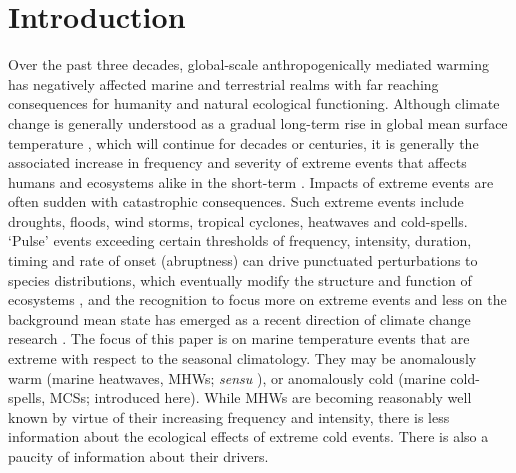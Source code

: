\documentclass[a4paper,10pt,review]{elsarticle}
\begin{document}
\linenumbers

\section{Introduction}

Over the past three decades, global-scale anthropogenically mediated warming has negatively affected marine and terrestrial realms with far reaching consequences for humanity and natural ecological functioning. Although climate change is generally understood as a gradual long-term rise in global mean surface temperature \citep{IPCC2014}, which will continue for decades or centuries, it is generally the associated increase in frequency and severity of extreme events that affects humans and ecosystems alike in the short-term \citep{Easterling2000}. Impacts of extreme events are often sudden with catastrophic consequences. Such extreme events include droughts, floods, wind storms, tropical cyclones, heatwaves and cold-spells. `Pulse' events exceeding certain thresholds of frequency, intensity, duration, timing and rate of onset (abruptness) can drive punctuated perturbations to species distributions, which eventually modify the structure and function of ecosystems \citep{Wernberg2013, Rehage2016}, and the recognition to focus more on extreme events and less on the background mean state has emerged as a recent direction of climate change research \citep{Jentsch2007}. The focus of this paper is on marine temperature events that are extreme with respect to the seasonal climatology. They may be anomalously warm (marine heatwaves, MHWs; \emph{sensu} \citet{Hobday2016}), or anomalously cold (marine cold-spells, MCSs; introduced here). While MHWs are becoming reasonably well known by virtue of their increasing frequency and intensity, there is less information about the ecological effects of extreme cold events. There is also a paucity of information about their drivers.
\end{document}
